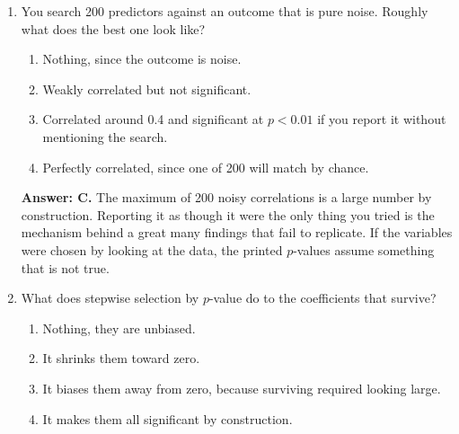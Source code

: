 \documentclass[11pt]{article}
\begin{document}
\begin{enumerate}[itemsep=14pt]
\begin{enumerate}[label=\Alph*., itemsep=1pt, topsep=3pt]
  \item Both become significant, since they share signal.
  \item The coefficients become unstable and each can look insignificant, even though together the pair clearly matters.
  \item The model refuses to fit.
  \item One is automatically dropped.
\end{enumerate}

\vspace{2pt}
\textbf{Answer: B.} The model cannot tell which twin deserves the credit, so it splits it in a way that swings wildly between refits, and the standard errors inflate. The tell is that each looks unimportant on its own while dropping both hurts badly. Insignificant here means indistinguishable from its twin, not unimportant.
\vspace{4pt}

\item You search 200 predictors against an outcome that is pure noise. Roughly what does the best one look like?

\begin{enumerate}[label=\Alph*., itemsep=1pt, topsep=3pt]
  \item Nothing, since the outcome is noise.
  \item Weakly correlated but not significant.
  \item Correlated around 0.4 and significant at $p<0.01$ if you report it without mentioning the search.
  \item Perfectly correlated, since one of 200 will match by chance.
\end{enumerate}

\vspace{2pt}
\textbf{Answer: C.} The maximum of 200 noisy correlations is a large number by construction. Reporting it as though it were the only thing you tried is the mechanism behind a great many findings that fail to replicate. If the variables were chosen by looking at the data, the printed $p$-values assume something that is not true.
\vspace{4pt}

\item What does stepwise selection by $p$-value do to the coefficients that survive?

\begin{enumerate}[label=\Alph*., itemsep=1pt, topsep=3pt]
  \item Nothing, they are unbiased.
  \item It shrinks them toward zero.
  \item It biases them away from zero, because surviving required looking large.
  \item It makes them all significant by construction.
\end{enumerate}


\end{enumerate}
\end{document}
